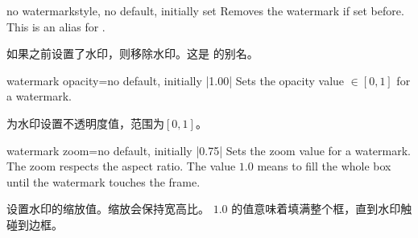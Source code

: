 \begin{docTcbKey}{no watermark}{}{style, no default, initially set}
Removes the watermark if set before. This is an alias for
.

如果之前设置了水印，则移除水印。这是  的别名。
\end{docTcbKey}


\begin{docTcbKey}{watermark opacity}{=}{no default, initially |1.00|}
Sets the opacity value $\in[0,1]$ for a watermark.

为水印设置不透明度值，范围为$[0,1]$。
\begin{dispExample}

\begin{tcolorbox}[title=Opacity 1.00,watermark opacity=1.00]
\lipsum[2]
\end{tcolorbox}\hfill%
\begin{tcolorbox}[title=Opacity 0.50,watermark opacity=0.50]
\lipsum[2]
\end{tcolorbox}%
\end{dispExample}
\end{docTcbKey}


\begin{docTcbKey}{watermark zoom}{=}{no default, initially |0.75|}
Sets the zoom value for a watermark. The zoom respects the aspect ratio.
The value $1.0$ means to fill the whole box until the watermark touches the frame.

设置水印的缩放值。缩放会保持宽高比。 $1.0$ 的值意味着填满整个框，直到水印触碰到边框。
\begin{dispExample}

\begin{tcolorbox}[title=Zoom 1.0,watermark zoom=1.0]
\lipsum[2]
\end{tcolorbox}\hfill%
\begin{tcolorbox}[title=Zoom 0.5,watermark zoom=0.5]
\lipsum[2]
\end{tcolorbox}%
\end{dispExample}
\end{docTcbKey}

